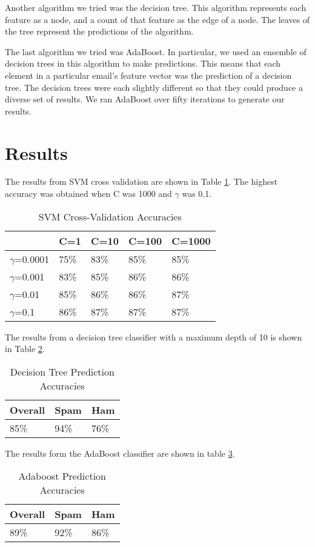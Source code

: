 Another algorithm we tried was the decision tree. This algorithm represents each feature as a node, and a count of that feature as the edge of a node. The leaves of the tree represent the predictions of the algorithm. 

The last algorithm we tried was AdaBoost. In particular, we used an ensemble of decision trees in this algorithm to make predictions. This means that each element in a particular email's feature vector was the prediction of a decision tree. The decision trees were each slightly different so that they could produce a diverse set of results. We ran AdaBoost over fifty iterations to generate our results.

\section{Results}
The results from SVM cross validation are shown in Table \ref{svm-cross-val}. The highest accuracy was obtained when C was 1000 and $\gamma$ was 0.1.

\begin{table}[hp]
\centering
\caption{SVM Cross-Validation Accuracies}
\label{svm-cross-val}
\begin{tabular}{|l|l|l|l|l|}
\hline
               & C=1 & C=10 & C=100 & C=1000 \\ \hline
$\gamma$=0.0001 & 75\%  & 83\%   & 85\%    & 85\%     \\ \hline
$\gamma$=0.001  & 83\%  & 85\%   & 86\%    & 86\%     \\ \hline
$\gamma$=0.01   & 85\%  & 86\%   & 86\%    & 87\%     \\ \hline
$\gamma$=0.1    & 86\%  & 87\%   & 87\%    & 87\%     \\ \hline
\end{tabular}
\end{table}

The results from a decision tree classifier with a maximum depth of 10 is shown in Table \ref{decision-tree-acc}.
\begin{table}[hp]
\centering
\caption{Decision Tree Prediction Accuracies}
\label{decision-tree-acc}
\begin{tabular}{|l|l|l|}
\hline
        Overall       &  Spam   &  Ham   \\ \hline
         85\%         &  94\%   & 76\%  \\ \hline
\end{tabular}
\end{table}

The results form the AdaBoost classifier are shown in table \ref{ada-boost-acc}.

\begin{table}[hp]
\centering
\caption{Adaboost Prediction Accuracies}
\label{ada-boost-acc}
\begin{tabular}{|l|l|l|}
\hline
        Overall       &  Spam   &  Ham   \\ \hline
         89\%         &  92\%   & 86\%  \\ \hline
\end{tabular}
\end{table}


